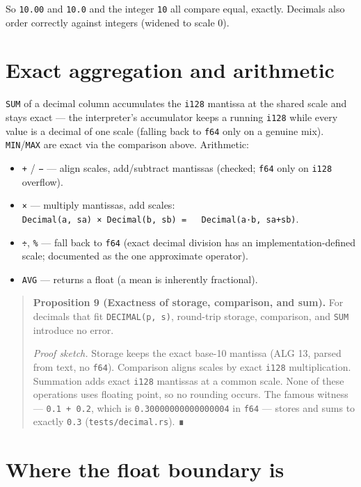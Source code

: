 \documentclass[
  11pt,
  openany]{book}
\providecommand{\tightlist}{%
  \setlength{\itemsep}{0pt}\setlength{\parskip}{0pt}}
\begin{document}
So \texttt{10.00} and \texttt{10.0} and the integer \texttt{10} all
compare equal, exactly. Decimals also order correctly against integers
(widened to scale 0).

\section{Exact aggregation and
arithmetic}\label{exact-aggregation-and-arithmetic}

\texttt{SUM} of a decimal column accumulates the \texttt{i128} mantissa
at the shared scale and stays exact --- the interpreter's accumulator
keeps a running \texttt{i128} while every value is a decimal of one
scale (falling back to \texttt{f64} only on a genuine mix).
\texttt{MIN}/\texttt{MAX} are exact via the comparison above.
Arithmetic:

\begin{itemize}
\tightlist
\item
  \texttt{+} / \texttt{−} --- align scales, add/subtract mantissas
  (checked; \texttt{f64} only on \texttt{i128} overflow).
\item
  \texttt{×} --- multiply mantissas, add scales:
  \texttt{Decimal(a,\ sa)\ ×\ Decimal(b,\ sb)\ =\ \ \ Decimal(a·b,\ sa+sb)}.
\item
  \texttt{÷}, \texttt{\%} --- fall back to \texttt{f64} (exact decimal
  division has an implementation-defined scale; documented as the one
  approximate operator).
\item
  \texttt{AVG} --- returns a float (a mean is inherently fractional).
\end{itemize}

\begin{quote}
\textbf{Proposition 9 (Exactness of storage, comparison, and sum).} For
decimals that fit \texttt{DECIMAL(p,\ s)}, round-trip storage,
comparison, and \texttt{SUM} introduce no error.

\emph{Proof sketch.} Storage keeps the exact base-10 mantissa (ALG 13,
parsed from text, no \texttt{f64}). Comparison aligns scales by exact
\texttt{i128} multiplication. Summation adds exact \texttt{i128}
mantissas at a common scale. None of these operations uses floating
point, so no rounding occurs. The famous witness ---
\texttt{0.1\ +\ 0.2}, which is \texttt{0.30000000000000004} in
\texttt{f64} --- stores and sums to exactly \texttt{0.3}
(\texttt{tests/decimal.rs}). ∎
\end{quote}

\section{Where the float boundary is}\label{where-the-float-boundary-is}
\end{document}
